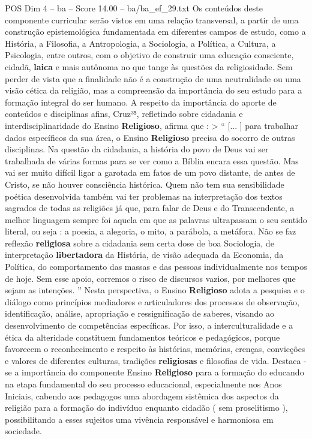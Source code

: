 \begin{textsample}{POS Dim 4 – ba – Score 14.00 – ba/ba\_ef\_29.txt}
Os conteúdos deste componente curricular serão vistos em uma relação transversal, a partir de uma construção epistemológica fundamentada em diferentes campos de estudo, como a História, a Filosofia, a Antropologia, a Sociologia, a Política, a Cultura, a Psicologia, entre outros, com o objetivo de construir uma educação consciente, cidadã, \textbf{laica} e mais autônoma no que tange às questões da religiosidade.
Sem perder de vista que a finalidade não é a construção de uma neutralidade ou uma visão cética da religião, mas a compreensão da importância do seu estudo para a formação integral do ser humano.
A respeito da importância do aporte de conteúdos e disciplinas afins, Cruz³⁵, refletindo sobre cidadania e interdisciplinaridade do Ensino \textbf{Religioso}, afirma que : > “ [... ] para trabalhar dados específicos da sua área, o Ensino \textbf{Religioso} precisa do socorro de outras disciplinas.
Na questão da cidadania, a história do povo de Deus vai ser trabalhada de várias formas para se ver como a Bíblia encara essa questão.
Mas vai ser muito difícil ligar a garotada em fatos de um povo distante, de antes de Cristo, se não houver consciência histórica.
Quem não tem sua sensibilidade poética desenvolvida também vai ter problemas na interpretação dos textos sagrados de todas as religiões já que, para falar de Deus e do Transcendente, a melhor linguagem sempre foi aquela em que as palavras ultrapassam o seu sentido literal, ou seja : a poesia, a alegoria, o mito, a parábola, a metáfora.
Não se faz reflexão \textbf{religiosa} sobre a cidadania sem certa dose de boa Sociologia, de interpretação \textbf{libertadora} da História, de visão adequada da Economia, da Política, do comportamento das massas e das pessoas individualmente nos tempos de hoje.
Sem esse apoio, corremos o risco de discursos vazios, por melhores que sejam as intenções. ” Nesta perspectiva, o Ensino \textbf{Religioso} adota a pesquisa e o diálogo como princípios mediadores e articuladores dos processos de observação, identificação, análise, apropriação e ressignificação de saberes, visando ao desenvolvimento de competências específicas.
Por isso, a interculturalidade e a ética da alteridade constituem fundamentos teóricos e pedagógicos, porque favorecem o reconhecimento e respeito às histórias, memórias, crenças, convicções e valores de diferentes culturas, tradições \textbf{religiosas} e filosofias de vida.
Destaca -se a importância do componente Ensino \textbf{Religioso} para a formação do educando na etapa fundamental do seu processo educacional, especialmente nos Anos Iniciais, cabendo aos pedagogos uma abordagem sistêmica dos aspectos da religião para a formação do indivíduo enquanto cidadão ( sem proselitismo ), possibilitando a esses sujeitos uma vivência responsável e harmoniosa em sociedade.

\end{textsample}
